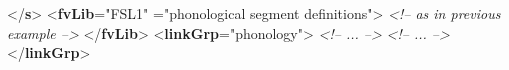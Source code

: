 \begin{shaded}
\mbox{}\newline 
{</\textbf{s}>}\mbox{}\newline 
{<\textbf{fvLib}\hspace*{1em}{xml:id}="{FSL1}"\mbox{}\newline 
\hspace*{1em}{n}="{phonological segment definitions}">}\mbox{}\newline 
\textit{<!-- as in previous example -->}\mbox{}\newline 
{</\textbf{fvLib}>}\mbox{}\newline 
{<\textbf{linkGrp}\hspace*{1em}{type}="{phonology}">}\mbox{}\newline 
\textit{<!-- ... -->}\mbox{}\newline 
{}\mbox{}\newline 
{}\mbox{}\newline 
{}\mbox{}\newline 
{}\mbox{}\newline 
\textit{<!-- ... -->}\mbox{}\newline 
{</\textbf{linkGrp}>}\end{shaded}\egroup\par \par
